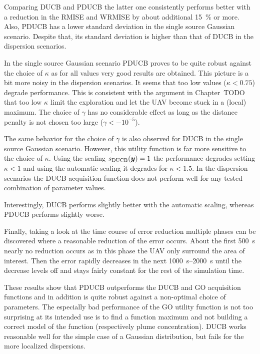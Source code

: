 Comparing DUCB and PDUCB the latter one consistently performs better with 
a reduction in the RMISE and WRMISE by about additional \SI{15}{\percent} or 
more. Also, PDUCB has a lower standard deviation in the single source Gaussian 
scenario. Despite that, its standard deviation is higher than that of DUCB in 
the dispersion scenarios.

In the single source Gaussian scenario PDUCB proves to be quite robust against 
the choice of $\kappa$ as for all values very good results are obtained. This 
picture is a bit more noisy in the dispersion scenarios. It seems that too low 
values ($\kappa < 0.75$) degrade performance. This is consistent with the 
argument in Chapter~TODO that too low $\kappa$ limit the exploration and let the 
UAV become stuck in a (local) maximum. The choice of $\gamma$ has no 
considerable effect as long as the distance penalty is not chosen too large 
($\gamma < -10^{-5}$).

The same behavior for the choice of $\gamma$ is also observed for DUCB in the 
single source Gaussian scenario. However, this utility function is far more 
sensitive to the choice of $\kappa$. Using the scaling $s_{\mathrm{DUCB}}(\bm{y}) = 1$ 
the performance degrades setting $\kappa < 1$ and using the automatic scaling it 
degrades for $\kappa < 1.5$. In the dispersion scenarios the DUCB acquisition 
function does not perform well for any tested combination of parameter values.

Interestingly,  DUCB performs slightly better with the automatic scaling, 
whereas PDUCB performs slightly worse.

Finally, taking a look at the time course of error reduction multiple phases can 
be discovered where a reasonable reduction of the error occurs. About the first 
\SI{500}{\second} nearly no reduction occurs as in this phase the UAV only 
surround the area of interest. Then the error rapidly decreases in the next 
\SIrange{1000}{2000}{\second} until the decrease levels off and stays fairly 
constant for the rest of the simulation time.

These results show that PDUCB outperforms the DUCB and GO acquisition functions 
and in addition is quite robust against a non-optimal choice of parameters. The 
especially bad performance of the GO utility function is not too surprising at 
its intended use is to find a function maximum and not building a correct model 
of the function (respectively plume concentration).  DUCB works reasonable well 
for the simple case of a Gaussian distribution, but fails for the more localized 
dispersions.

